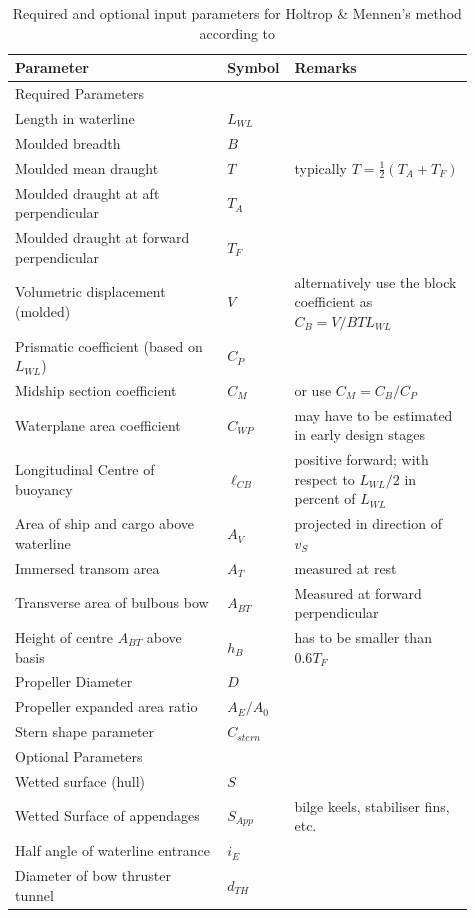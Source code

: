 \begin{table}[ht]
    \footnotesize
    \centering
    {\begin{tabular}{ p{0.45\linewidth} p{0.08\linewidth} p{0.38\linewidth}  }
    \hline
    \textbf{Parameter} & \textbf{Symbol} & \textbf{Remarks} \\
    \hline
    Required Parameters&&\\
    \hline
    Length in waterline & $L_{WL}$\\
    Moulded breadth & $B$ \\
    Moulded mean draught & $T$ & typically $T = \frac{1}{2}(T_A+T_F)$ \\
    Moulded draught at aft perpendicular & $T_A$ & \\ 
    Moulded draught at forward perpendicular & $T_F$\\
    Volumetric displacement (molded) & $V$ & alternatively use the block \mbox{coefficient} as $C_B = V/BTL_{WL}$\\
    Prismatic coefficient (based on $L_{WL}$) & $C_P$ \\
    Midship section coefficient & $C_M$ & or use $C_M=C_B/C_P$ \\
    Waterplane area coefficient & $C_{WP}$ & may have to be estimated in early design stages\\
    Longitudinal Centre of buoyancy & $\ell_{CB}$ &positive forward; with respect to $L_{WL}/2$ in percent of $L_{WL}$\\
    Area of ship and cargo above waterline & $A_V$ & projected in direction of $v_S$\\
    Immersed transom area & $A_T$ & measured at rest\\
    Transverse area of bulbous bow & $A_{BT}$ & Measured at forward perpendicular \\
    Height of centre $A_{BT}$ above basis & $h_B$ & has to be smaller than $0.6T_F$ \\
    Propeller Diameter & $D$ \\
    Propeller expanded area ratio & $A_E/A_0$ \\
    Stern shape parameter & $C_{stern}$ \\
    \hline
    Optional Parameters&&\\
    \hline
    Wetted surface (hull) & $S$\\
    Wetted Surface of appendages & $S_{App}$ & bilge keels, stabiliser fins, etc.\\
    Half angle of waterline entrance & $i_E$ \\
    Diameter of bow thruster tunnel & $d_{TH}$ \\
    \hline
    \end{tabular}}
\caption{Required and optional input parameters for Holtrop \& Mennen's method according to }\label{tbl:holtrop_params}
\end{table}

